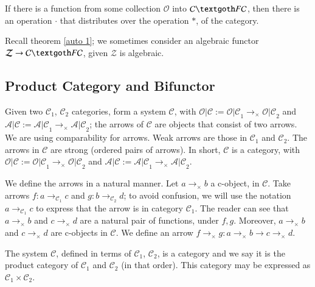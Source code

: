 \documentclass [12pt]{book}
\begin{document}
\begin{proposition}If there is a function from some collection $\mathcal O$ into $\mathcal C\textgoth F\mathcal C$, then there is an operation $\cdot$ that distributes over the operation $*$, of the category.\end{proposition}

Recall theorem \ref{auto 1}; we sometimes consider an algebraic functor $\mathcal Z\rightarrow\mathcal C\textgoth F\mathcal C$, given $\mathcal Z$ is algebraic.
		
			\subsection{Product Category and Bifunctor}

Given two $\mathcal C_1$, $\mathcal C_2$ categories, form a system $\mathcal C$, with $\mathcal{O|C}:=\mathcal{O|C}_1\rightarrow_\times\mathcal{O|C}_2$ and $\mathcal{A|C}:=\mathcal{A|C}_1\rightarrow_\times\mathcal{A|C}_2$; the arrows of $\mathcal C$ are objects that consist of two arrows. We are using comparability for arrows. Weak arrows are those in $\mathcal C_1$ and $\mathcal C_2$. The arrows in $\mathcal C$ are strong (ordered pairs of arrows). In short, $\mathcal C$ is a category, with $\mathcal{O|C}:=\mathcal{O|C}_1\rightarrow_\times\mathcal{O|C}_2$ and $\mathcal{A|C}:=\mathcal{A|C}_1\rightarrow_\times\mathcal{A|C}_2$.





We define the arrows in a natural manner. Let $a\rightarrow_\times b$ a c-object, in $\mathcal C$. Take arrows $f:a\rightarrow_{\mathcal C_1}c$ and $g:b\rightarrow_{\mathcal C_2}d$; to avoid confusion, we will use the notation $a\rightarrow_{\mathcal C_1}c$ to express that the arrow is in category $\mathcal C_1$. The reader can see that $a\rightarrow_\times b$ and $c\rightarrow_\times d$ are a natural pair of functions, under $f,g$. Moreover, $a\rightarrow_\times b$ and $c\rightarrow_\times d$ are c-objects in $\mathcal C$. We define an arrow $f\rightarrow_\times g:a\rightarrow_\times b\longrightarrow c\rightarrow_\times d$.

\begin{theorem}The system $\mathcal C$, defined in terms of $\mathcal C_1$, $\mathcal C_2$, is a category and we say it is the product category of $\mathcal C_1$ and $\mathcal C_2$ (in that order). This category may be expressed as $\mathcal C_1\times\mathcal C_2$.\end{theorem}
\end{document}
